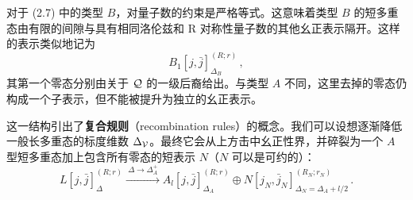 对于 (2.7) 中的类型 $B$，对量子数的约束是严格等式。这意味着类型 $B$ 的短多重态由有限的间隙与具有相同洛伦兹和 R 对称性量子数的其他幺正表示隔开。这样的表示类似地记为
\begin{equation}
  B_1[j,\bar j]^{(R;r)}_{\Delta_B}\,,
  \tag{2.9}
\end{equation}
其第一个零态分别由关于 $\mathcal{Q}$ 的一级后裔给出。与类型 $A$ 不同，这里去掉的零态仍构成一个子表示，但不能被提升为独立的幺正表示。

这一结构引出了\textbf{复合规则}（recombination rules）的概念。我们可以设想逐渐降低一般长多重态的标度维数 $\Delta_{\mathcal{V}}$。最终它会从上方击中幺正性界，并碎裂为一个 $A$ 型短多重态加上包含所有零态的短表示 $N$（$N$ 可以是可约的）：
\begin{equation}
  L[j,\bar j]^{(R;r)}_\Delta
  \xrightarrow{\ \Delta\to\Delta_A^+\ }
  A_l[j,\bar j]^{(R;r)}_{\Delta_A}\oplus N[j_N,\bar j_N]^{(R_N;r_N)}_{\Delta_N=\Delta_A+l/2}\,.
  \tag{2.10}
\end{equation}
